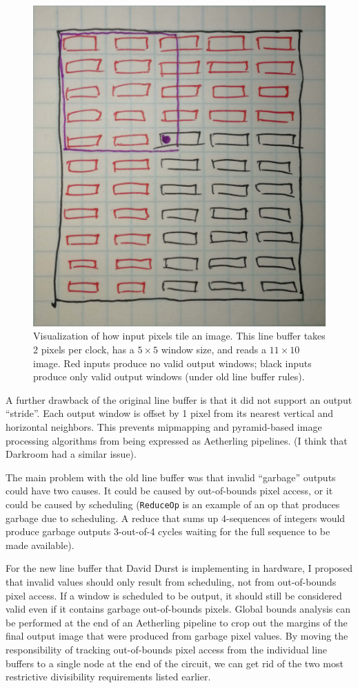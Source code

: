 \documentclass[12pt]{article}
\begin{document}
\begin{figure}
\centering
\includegraphics[width=0.5\linewidth]{Figures/old-lb-tiling.jpg}
\caption{Visualization of how input pixels tile an image. This line
buffer takes 2 pixels per clock, has a $5 \times 5$ window size,
and reads a $11 \times 10$ image. Red inputs produce no
valid output windows; black inputs produce only valid output windows
(under old line buffer rules).}
\label{old-lb-tiling.jpg}
\end{figure}

A further drawback of the original line buffer is that it did not
support an output ``stride''. Each output window is offset by 1 pixel
from its nearest vertical and horizontal neighbors. This prevents
mipmapping and pyramid-based image processing algorithms from being
expressed as Aetherling pipelines. (I think that Darkroom had a
similar issue).

The main problem with the old line buffer was that invalid ``garbage''
outputs could have two causes. It could be caused by out-of-bounds
pixel access, or it could be caused by scheduling (\texttt{ReduceOp}
is an example of an op that produces garbage due to scheduling. A
reduce that sums up 4-sequences of integers would produce garbage
outputs 3-out-of-4 cycles waiting for the full sequence to be made
available).

For the new line buffer that David Durst is implementing in hardware,
I proposed that invalid values should only result from scheduling, not
from out-of-bounds pixel access. If a window is scheduled to be
output, it should still be considered valid even if it contains
garbage out-of-bounds pixels. Global bounds analysis can be performed
at the end of an Aetherling pipeline to crop out the margins of the
final output image that were produced from garbage pixel values.  By
moving the responsibility of tracking out-of-bounds pixel access from
the individual line buffers to a single node at the end of the
circuit, we can get rid of the two most restrictive divisibility
requirements listed earlier.
\end{document}
